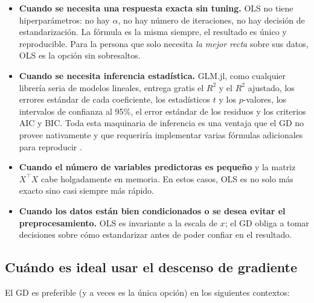 \documentclass[11pt,a4paper]{article}
\begin{document}
\begin{itemize}
    \item \textbf{Cuando se necesita una respuesta exacta sin tuning.} OLS no tiene hiperparámetros: no hay $\alpha$, no hay número de iteraciones, no hay decisión de estandarización. La fórmula es la misma siempre, el resultado es único y reproducible. Para la persona que solo necesita \textit{la mejor recta} sobre sus datos, OLS es la opción sin sobresaltos.
    \item \textbf{Cuando se necesita inferencia estadística.} GLM.jl, como cualquier librería seria de modelos lineales, entrega gratis el $R^2$ y el $R^2$ ajustado, los errores estándar de cada coeficiente, los estadísticos $t$ y los $p$-valores, los intervalos de confianza al 95\%, el error estándar de los residuos y los criterios AIC y BIC. Toda esta maquinaria de inferencia es una ventaja que el GD no provee nativamente y que requeriría implementar varias fórmulas adicionales para reproducir \cite{astm_calidad}.
    \item \textbf{Cuando el número de variables predictoras es pequeño} y la matriz $X^{\top}X$ cabe holgadamente en memoria. En estos casos, OLS es no solo más exacto sino casi siempre más rápido.
    \item \textbf{Cuando los datos están bien condicionados o se desea evitar el preprocesamiento.} OLS es invariante a la escala de $x$; el GD obliga a tomar decisiones sobre cómo estandarizar antes de poder confiar en el resultado.
\end{itemize}

\subsection{Cuándo es ideal usar el descenso de gradiente}

El GD es preferible (y a veces es la única opción) en los siguientes contextos:
\end{document}
